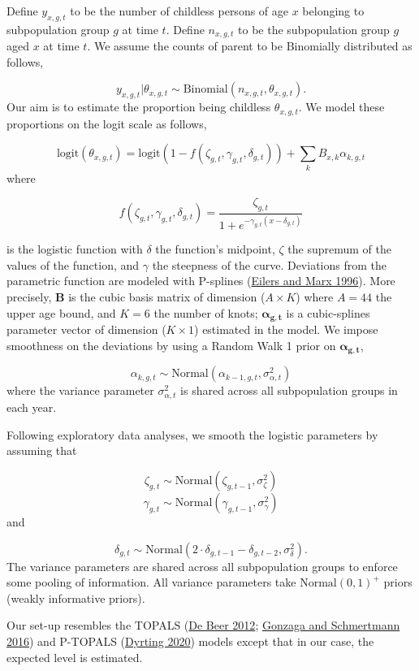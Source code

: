 \documentclass[
  11pt,
  letterpaper,
]{article}
\begin{document}
Define \(y_{x, g, t}\) to be the number of childless persons of age \(x\) belonging to subpopulation group \(g\) at time \(t\). Define \(n_{x, g, t}\) to be the subpopulation group \(g\) aged \(x\) at time \(t\). We assume the counts of parent to be Binomially distributed as follows,

\[y_{x, g, t}|\theta_{x,g,t} \sim \text{Binomial}(n_{x, g, t}, \theta_{x,g,t}).\]
Our aim is to estimate the proportion being childless \(\theta_{x,g,t}\). We model these proportions on the logit scale as follows,

\[\text{logit}(\theta_{x,g,t}) = \text{logit}(1 - f(\zeta_{g, t}, \gamma_{g, t}, \delta_{g, t})) + \sum_k B_{x,k} \alpha_{k,g,t}\]
where

\[f(\zeta_{g, t}, \gamma_{g, t}, \delta_{g, t}) =  \frac{\zeta_{g, t}}{1+e^{-\gamma_{g, t}(x-\delta_{g, t})}}\]

is the logistic function with \(\delta\) the function's midpoint, \(\zeta\) the supremum of the values of the function, and \(\gamma\) the steepness of the curve. Deviations from the parametric function are modeled with P-splines (\protect\hyperlink{ref-eilers1996flexible}{Eilers and Marx 1996}). More precisely, \(\boldsymbol{B}\) is the cubic basis matrix of dimension (\(A \times K\)) where \(A=44\) the upper age bound, and \(K=6\) the number of knots; \(\boldsymbol{\alpha_{g,t}}\) is a cubic-splines parameter vector of dimension (\(K \times 1\)) estimated in the model. We impose smoothness on the deviations by using a Random Walk 1 prior on \(\boldsymbol{\alpha_{g,t}}\),

\[\alpha_{k,g,t} \sim \text{Normal}(\alpha_{k-1,g,t}, \sigma_{\alpha, t}^2)\]
where the variance parameter \(\sigma_{\alpha,t}^2\) is shared across all subpopulation groups in each year.

Following exploratory data analyses, we smooth the logistic parameters by assuming that

\[\zeta_{g,t} \sim \text{Normal}(\zeta_{g,t-1}, \sigma_{\zeta}^2)\]
\[\gamma_{g,t} \sim \text{Normal}(\gamma_{g,t-1}, \sigma_{\gamma}^2)\]
and

\[\delta_{g,t} \sim \text{Normal}(2\cdot \delta_{g,t-1} - \delta_{g,t-2}, \sigma_{\delta}^2).\]
The variance parameters are shared across all subpopulation groups to enforce some pooling of information. All variance parameters take \(\text{Normal}(0,1)^+\) priors (weakly informative priors).

Our set-up resembles the TOPALS (\protect\hyperlink{ref-de2012smoothing}{De Beer 2012}; \protect\hyperlink{ref-gonzaga2016estimating}{Gonzaga and Schmertmann 2016}) and P-TOPALS (\protect\hyperlink{ref-dyrting2020smoothing}{Dyrting 2020}) models except that in our case, the expected level is estimated.
\end{document}

